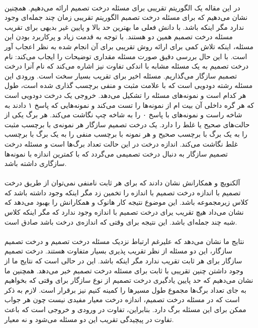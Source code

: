 \documentclass[a4paper]{article}
\begin{document}
	\paragraph{}
	در این مقاله یک الگوریتم تقریبی 
	برای مسئله درخت تصمیم ارائه می‌دهیم.
	همچنین نشان می‌دهیم که برای مسئله درخت تصمبم الگوریتم تقریبی زمان چند جمله‌ای وجود ندارد مگر اینکه 
	باشد.
	با دانش فعلی ما بهترین حد بالا و پایین غیر بدیهی برای تقریب مسئله درخت تصمبم همین دو هستند.
	با توجه به قدمت زیاد و پرکاربرد بودن این مسئله، اینکه تلاش کمی برای ارائه روش تقریبی برای آن انجام شده به نظر
	اعجاب آور است.
	با این حال بررسی دقیق صورت مسئله مقداری توضیحات را ایجاب می‌کند:
	نام درخت تصمیم به یک مسئله مشابه با اندکی تفاوت نیز اشاره می‌کند که نام آنرا درخت تصمبم سازگار می‌گذاریم.
	مسئله اخیر برای تقریب بسیار سخت است. ورودی این مسئله 
	رشته دودویی است که با علامت مثبت و منفی برچسب گذاری شده است، طول هر کدام 
	است و نمونه‌های مسئله را تشکیل می‌دهد. خروجی یک درخت دودویی است که هر گره داخلی آن بیت 
	ام از نمونه‌‌ها را تست می‌کند و نمونه‌هایی که پاسخ ۱ دادند به شاخه راست و نمونه‌های با پاسخ ۰ را به شاخه چپ نگاشت
	می‌کند. هر برگ یکی از حالت‌های صحیح یا غلط را دارد. یک درخت تصمیم سازگار هر نمونه‌ی با برچسب مثبت را به یک برگ
	با برچسب صحیح و هر نمونه با برچسب منفی را به یک برگ با برچسب غلط نگاشت می‌کند. اندازه درخت در این حالت تعداد
	برگ‌ها است و مسئله درخت تصمیم سازگار به دنبال درخت تصمیمی می‌گردد که با کمترین اندازه با نمونه‌ها سازگاری داشته باشد.
	\paragraph{}
	آلکنویچ و همکارانش نشان دادند که برای هر ثابت نامنفی
	نمی‌توان از طریق درخت تصمیم با اندازه
	درخت تصمیم با اندازه
	را تخمین زد مگر اینکه
	وجود داشته باشد که کلاس
	زیرمجموعه 
	باشد. این موضوع نتیجه کار هانوک و همکارانش را بهبود می‌دهد که نشان می‌داد هیچ تقریب 
	یرای درخت تصمیم با اندازه 
	وجود ندارد که 
	مگر اینکه کلاس 
	شبه چند جمله‌ای باشد. این نتیجه برای وقتی که اندازه‌ی درخت
	باشد صادق است.
	\paragraph{}
	نتایج ما نشان می‌دهد که علیرغم ارتباط نزدیک مسئله درخت تصمیم و درخت تصمیم سازگار، این دو مسئله از نظر تقریب پذیری بسیار متفاوت هستند. درخت تصمیم سازگار برای هر ثابت
	تقریب 
	ندارد مگر اینکه
	باشد. این در حالی است که نتایج ما از وجود داشتن چنین تقریبی با ثابت
	برای مسئله درخت تصمبم خبر می‌دهد.
	همچنین ما نشان می‌دهیم که حد پایین یادگیری درخت تصمیم از نوع سازگار برای وقتی که بخواهیم به جای تعداد برگ‌ها
	مجموع طول مسیرها را کمینه کنیم نیز برقرار است. لازم به ذکر است که در مسئله درخت تصمیم، اندازه درخت معیار مفیدی
	نیست چون هر جواب ممکن برای این مسئله 
	برگ دارد. بنابراین، تفاوت در ورودی و خروجی است که باعث تفاوت در پیچیدگی تقریب این دو مسئله می‌شود و نه معیار.
\end{document}
